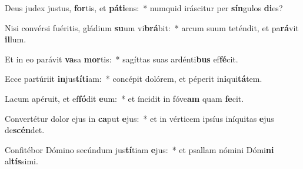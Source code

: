 \item Deus judex justus, \textbf{for}tis, et \textbf{pá}\textbf{ti}ens:~* numquid iráscitur per \textbf{sín}gulos \textbf{di}es?
\item Nisi convérsi fuéritis, gládium \textbf{su}um vi\textbf{brá}bit:~* arcum suum teténdit, et pa\textbf{rá}vit \textbf{il}lum.
\item Et in eo parávit \textbf{va}sa \textbf{mor}tis:~* sagíttas suas ardénti\textbf{bus} ef\textbf{fé}cit.
\item Ecce partúriit \textbf{in}jus\textbf{tí}\textbf{ti}am:~* concépit dolórem, et péperit in\textbf{i}qui\textbf{tá}tem.
\item Lacum apéruit, et ef\textbf{fó}dit \textbf{e}um:~* et íncidit in fóve\textbf{am} quam \textbf{fe}cit.
\item Convertétur dolor ejus in \textbf{ca}put \textbf{e}jus:~* et in vérticem ipsíus iníquitas \textbf{e}jus de\textbf{scén}det.
\item Confitébor Dómino secúndum jus\textbf{tí}tiam \textbf{e}jus:~* et psallam nómini Dómi\textbf{ni} al\textbf{tís}simi.
